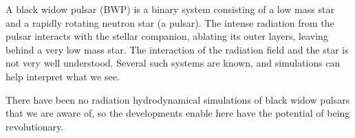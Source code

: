 A black widow pulsar (BWP) is a binary system consisting of a low mass
star and a rapidly rotating neutron star (a pulsar).  The intense
radiation from the pulsar interacts with the stellar companion,
ablating its outer layers, leaving behind a very low mass star.  The
interaction of the radiation field and the star is not very well
understood.  Several such systems are known, and simulations can
help interpret what we see.

There have been no radiation hydrodynamical simulations of black widow
pulsars that we are aware of, so the developments enable here have the
potential of being revolutionary.  


